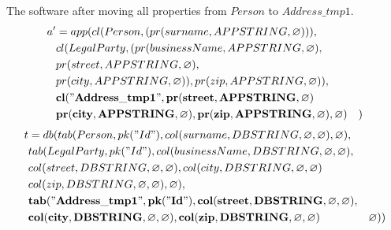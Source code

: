 \documentclass[11pt]{article}
\begin{document}
%
%
\newpage
The software after moving all properties from $Person$ to $Address\_tmp1$.
\medskip
\hline
\begin{align*}
a' &=app(cl(Person, (pr(surname, APPSTRING, \varnothing))), \\
& cl(LegalParty, (pr(businessName, APPSTRING, \varnothing), \\
& pr(street, APPSTRING, \varnothing), \\
& pr(city, APPSTRING, \varnothing)), pr(zip, APPSTRING, \varnothing)), \\
& \mathbf{cl("Address\_tmp1", pr(street, APPSTRING, \varnothing) } \\
& \mathbf{pr(city, APPSTRING, \varnothing), pr(zip, APPSTRING, \varnothing), \varnothing)}
& )
\end{align*}
\begin{align*}
t &=db(tab(Person, pk("Id"), col(surname, DBSTRING, \varnothing, \varnothing), \varnothing), \\
& tab(LegalParty, pk("Id"),  col(businessName, DBSTRING, \varnothing, \varnothing), \\
& col(street, DBSTRING, \varnothing, \varnothing), col(city, DBSTRING, \varnothing, \varnothing) \\
& col(zip, DBSTRING, \varnothing, \varnothing), \varnothing), \\
& \mathbf{tab("Address\_tmp1", pk("Id"), col(street, DBSTRING, \varnothing, \varnothing),}\\
& \mathbf{col(city, DBSTRING, \varnothing, \varnothing), col(zip, DBSTRING, \varnothing, \varnothing)}
& \varnothing)) 
\end{align*}
\end{document}
